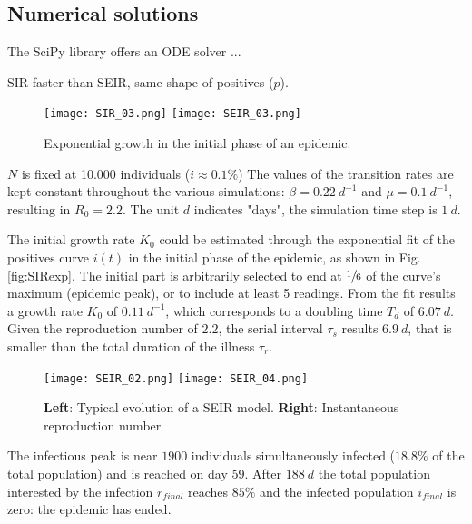 \documentclass[DIV=12, BCOR=0pt]{scrartcl}  %
\begin{document}
	  
  
  \subsection{Numerical solutions}
	The SciPy library offers an ODE solver ...
	


	SIR faster than SEIR, same shape of positives ($p$).
	
		 \begin{figure}[h!]
		\centering
		\texttt{[image: SIR\_03.png]}
		\texttt{[image: SEIR\_03.png]}
		\caption{Exponential growth in the initial phase of an epidemic. }
		\label{fig:BothExp}
	\end{figure}

	$N$ is fixed at 10.000 individuals
	($i \approx 0.1 \%$)
	The values of the transition rates are kept constant throughout the various simulations: $\beta = 0.22 \ d^{-1}$ and $\mu = 0.1 \ d^{-1}$, resulting in $R_0 = 2.2$. The unit $d$ indicates "days", the simulation time step is $1 \ d$.



	The initial growth rate $K_0$ could be estimated through the exponential fit of the positives curve $i(t)$ in the initial phase of the epidemic, as shown in Fig. \ref{fig:SIRexp}. The initial part is arbitrarily selected to end at $\sfrac{1}{6}$ of the curve's maximum (epidemic peak), or to include at least 5 readings. From the fit results a growth rate $K_0$ of $0.11 \ d^{-1}$, which corresponds to a doubling time $T_{d}$ of $6.07 \ d$. Given the reproduction number of $2.2$, the serial interval $\tau_s$ results $6.9 \ d$, that is smaller than the total duration of the illness $\tau_{r}$.

	\begin{figure}[h!]
		\centering
		\texttt{[image: SEIR\_02.png]}
		\texttt{[image: SEIR\_04.png]}
		\caption{\textbf{Left}: Typical evolution of a SEIR model. \textbf{Right}: Instantaneous reproduction number }
		\label{fig:SIRtot}
	\end{figure}
	 
	The infectious peak is near $1900$ individuals simultaneously infected ($18.8 \%$ of the total population) and is reached on day 59. After $188 \ d$ the total population interested by the infection $r_{final}$ reaches $85 \%$ and the infected population $i_{final}$ is zero: the epidemic has ended. 
	
\end{document}
